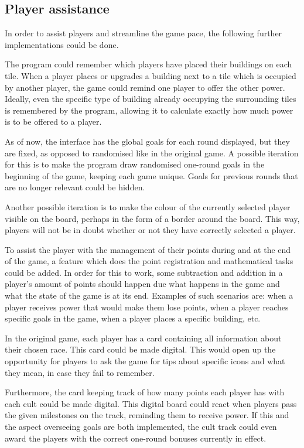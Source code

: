 \subsection{Player assistance}
In order to assist players and streamline the game pace, the following further implementations could be done.

The program could remember which players have placed their buildings on each tile. When a player places or upgrades a building next to a tile which is occupied by another player, the game could remind one player to offer the other power. Ideally, even the specific type of building already occupying the surrounding tiles is remembered by the program, allowing it to calculate exactly how much power is to be offered to a player.

As of now, the interface has the global goals for each round displayed, but they are fixed, as opposed to randomised like in the original game. A possible iteration for this is to make the program draw randomised one-round goals in the beginning of the game, keeping each game unique. Goals for previous rounds that are no longer relevant could be hidden.

Another possible iteration is to make the colour of the currently selected player visible on the board, perhaps in the form of a border around the board. This way, players will not be in doubt whether or not they have correctly selected a player.

To assist the player with the management of their points during and at the end of the game, a feature which does the point registration and mathematical tasks could be added. In order for this to work, some subtraction and addition in a player’s amount of points should happen due what happens in the game and what the state of the game is at its end. Examples of such scenarios are: when a player receives power that would make them lose points, when a player reaches specific goals in the game, when a player places a specific building, etc. 

In the original game, each player has a card containing all information about their chosen race. This card could be made digital. This would open up the opportunity for players to ask the game for tips about specific icons and what they mean, in case they fail to remember.

Furthermore, the card keeping track of how many points each player has with each cult could be made digital. This digital board could react when players pass the given milestones on the track, reminding them to receive power. If this and the aspect overseeing goals are both implemented, the cult track could even award the players with the correct one-round bonuses currently in effect.  

